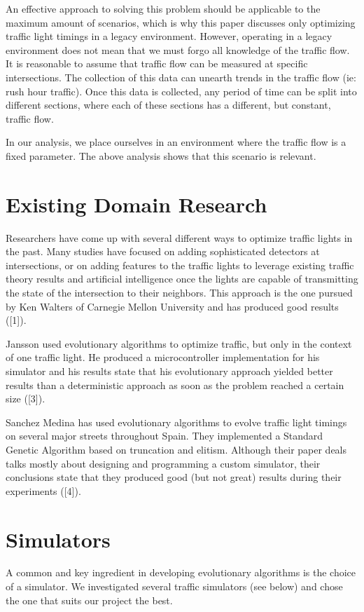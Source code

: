 \documentclass{article} %
\begin{document}
An effective approach to solving this problem should be applicable to the maximum amount of scenarios, which is why this paper discusses only optimizing traffic light timings in a legacy environment.
However, operating in a legacy environment does not mean that we must forgo all knowledge of the traffic flow. It is reasonable to assume that traffic flow can be measured at specific intersections. The collection of this data can unearth trends in the traffic flow (ie: rush hour traffic). Once this data is collected, any period of time can be split into different sections, where each of these sections has a different, but constant, traffic flow.


In our analysis, we place ourselves in an environment where the traffic flow is a fixed parameter. The above analysis shows that this scenario is relevant.

\section{Existing Domain Research}
Researchers have come up with several different ways to optimize traffic lights in the past. Many studies have focused on adding sophisticated detectors at intersections, or on adding features to the traffic lights to leverage existing traffic theory results and artificial intelligence once the lights are capable of transmitting the state of the intersection to their neighbors. This approach is the one pursued by Ken Walters of Carnegie Mellon University and has produced good results ([1]).

Jansson used evolutionary algorithms to optimize traffic, but only in the context of one traffic light. He produced a microcontroller implementation for his simulator and his results state that his evolutionary approach yielded better results than a deterministic approach as soon as the problem reached a certain size ([3]).

Sanchez Medina has used evolutionary algorithms to evolve traffic light timings on several major streets throughout Spain. They implemented a Standard Genetic Algorithm based on truncation and elitism. Although their paper deals talks mostly about designing and programming a custom simulator, their conclusions state that they produced good (but not great) results during their experiments ([4]).


\section{Simulators}
A common and key ingredient in developing evolutionary algorithms is the choice of a simulator. We investigated several traffic simulators (see below) and chose the one that suits our project the best.
\end{document}
